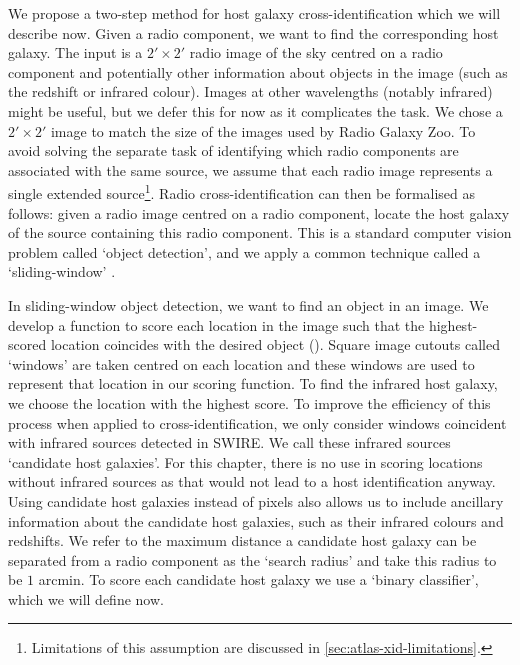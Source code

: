     We propose a two-step method for host galaxy cross-identification
    {which we will describe now}. Given a radio component, we want to find
    the corresponding host galaxy. The input is a $2' \times
    2'$ radio image of
    the sky centred on a radio component {and potentially other information about
    objects in the image (such as the redshift or infrared colour)}. {Images at other wavelengths (notably infrared) might be
    useful, but we defer this for now as it complicates the task.
    {We chose a $2' \times 2'$ image to match} the size of the images used
    by Radio Galaxy Zoo. To avoid solving the separate task of identifying
    which radio components are associated with the same source, we assume
    that each radio image represents a single extended
    source\footnote{Limitations of this assumption are discussed in
    \autoref{sec:atlas-xid-limitations}.}. Radio cross-identification can then
    be formalised as follows: given a radio image centred on a radio
    component, locate the host galaxy of the source containing this radio
    component. This is a standard computer vision problem called `object
    detection', and we apply a common technique called a `sliding-window'
    \citep{rowley1996facedetection}}.

    {In sliding-window object detection, we want to find an object in an image.
    We develop a function to score each location in the image such that the
    highest-scored location coincides with the desired object (). Square image
    cutouts called `windows' are taken centred on each location and these
    windows are used to represent that location in our scoring function. To
    find the infrared host galaxy, we choose the location with the highest
    score. To improve the efficiency of this process when applied to
    cross-identification, we only consider windows coincident with infrared
    sources detected in SWIRE. We call these infrared sources `candidate
    host galaxies'. For this chapter, there is no use in scoring
    locations without infrared sources as that would not lead to a host identification
    anyway. Using candidate host galaxies instead of pixels also
    allows us to include ancillary information about the candidate host
    galaxies, such as their infrared colours and redshifts. We refer to the
    maximum distance a candidate host galaxy can be separated from a radio component as
    the `search radius' and take this radius to be $1$ arcmin. To score each
    candidate host galaxy we use a `binary classifier', which we will define
    now.}

